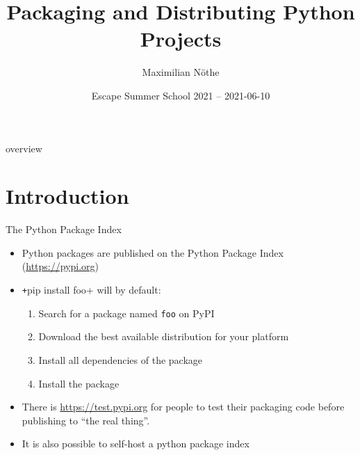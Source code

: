 \documentclass[
  aspectratio=1610,
]{beamer}
\author[M. Nöthe]{Maximilian Nöthe}
\title[Packaging]{Packaging and Distributing Python Projects}
\date[2021-03-10]{Escape Summer School 2021 – 2021-06-10}
\institute[TU Dortmund]{Astroparticle Physics, TU Dortmund}
\begin{document}
\maketitle

\begin{frame}[c]{overview}
  \tableofcontents
\end{frame}

\section{Introduction}

\begin{frame}[c]{The Python Package Index}
  \begin{itemize}
    \item Python packages are published on the Python Package Index (\url{https://pypi.org})
    \item \texttt+pip install foo+ will by default:
      \begin{enumerate}
        \item Search for a package named \texttt{foo} on PyPI
        \item Download the best available distribution for your platform
        \item Install all dependencies of the package
        \item Install the package
      \end{enumerate}
    \item There is \url{https://test.pypi.org} for people to test their packaging code before
      publishing to \enquote{the real thing}.
    \item It is also possible to self-host a python package index
  \end{itemize}
\end{frame}
\end{document}
